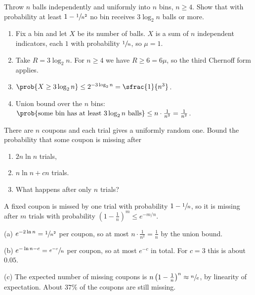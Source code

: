 
\begin{exercisebox}
\begin{pproblem}\label{pp:balls}
    Throw $n$ balls independently and uniformly into $n$ bins, $n \geq 4$. Show that with probability
    at least $1 - \sfrac{1}{n^2}$ no bin receives $3 \log_2 n$ balls or more.
\end{pproblem}
\tcblower
\begin{wsolution}
    \leavevmode
    \begin{enumerate}
        \item Fix a bin and let $X$ be its number of balls. $X$ is a sum of $n$ independent
              indicators, each $1$ with probability $\sfrac{1}{n}$, so $\mu = 1$.
        \item Take $R = 3 \log_2 n$. For $n \geq 4$ we have $R \geq 6 = 6\mu$, so the third Chernoff
              form applies.
        \item $\prob{X \geq 3 \log_2 n} \leq 2^{-3 \log_2 n} = \sfrac{1}{n^3}$.
        \item Union bound over the $n$ bins:
              $\prob{\text{some bin has at least } 3 \log_2 n \text{ balls}} \leq n \cdot \frac{1}{n^3} = \frac{1}{n^2}$. \qedhere
    \end{enumerate}
\end{wsolution}
\end{exercisebox}

\begin{exercisebox}
\begin{pproblem}\label{pp:coupon}
    There are $n$ coupons and each trial gives a uniformly random one. Bound the probability that
    some coupon is missing after
    \begin{enumerate}[label=(\alph*)]
        \item $2n \ln n$ trials,
        \item $n \ln n + cn$ trials.
        \item What happens after only $n$ trials?
    \end{enumerate}
\end{pproblem}
\tcblower
\begin{wsolution}
    A fixed coupon is missed by one trial with probability $1 - \sfrac{1}{n}$, so it is missing
    after $m$ trials with probability $\left(1 - \frac{1}{n}\right)^m \leq e^{-m/n}$.

    (a) $e^{-2 \ln n} = \sfrac{1}{n^2}$ per coupon, so at most $n \cdot \frac{1}{n^2} = \frac{1}{n}$
    by the union bound.

    (b) $e^{-\ln n - c} = \sfrac{e^{-c}}{n}$ per coupon, so at most $e^{-c}$ in total. For $c = 3$
    this is about $0.05$.

    (c) The expected number of missing coupons is
    $n\left(1 - \frac{1}{n}\right)^n \approx \sfrac{n}{e}$, by linearity of expectation. About
    $37\%$ of the coupons are still missing.
\end{wsolution}
\end{exercisebox}

